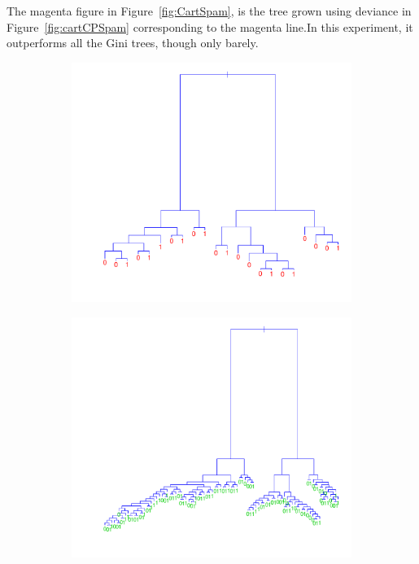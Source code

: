 The magenta figure in Figure~\ref{fig:CartSpam}, is the tree grown using deviance in Figure~\ref{fig:cartCPSpam} corresponding to the magenta line.In this experiment, it outperforms all the Gini trees, though only barely. 

\begin{figure}[htb]
  \centering
  \begin{subfigure}[b]{0.48\textwidth}
    \includegraphics[width=\textwidth]{./figures/cartSmallSpam.pdf}
  \end{subfigure}%
  \quad
  \begin{subfigure}[b]{0.48\textwidth}
    \includegraphics[width=\textwidth]{./figures/cartOptSpam.pdf}

\end{subfigure}
\end{figure}
